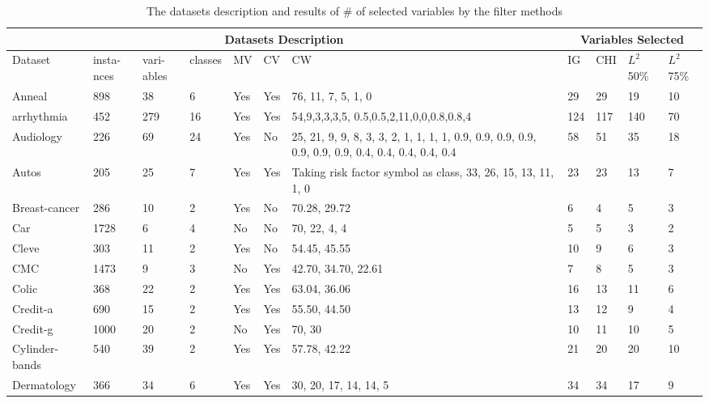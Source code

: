 \documentclass[review]{elsarticle}
\begin{document}
\begin{table}[p]
	\centering
	\caption[short tbl1 table1]{The datasets description and results of \# of selected variables by the filter methods}
	\label{tab:tbl1}
	
\begin{tabular}{|p{1.5cm}|p{0.5cm}|p{0.5cm}|p{0.5cm}|p{0.5cm}|p{0.5cm}|p{3cm}|p{0.5cm}|p{0.5cm}|p{1cm}|p{1cm}|}
	
	
	\hline 
	\multicolumn{7}{|c|}{Datasets Description} &
	\multicolumn{4}{|c|}{ Variables Selected } \\ 

\hline Dataset & insta-nces & vari-ables & classes & MV & CV & CW & IG & CHI & $ L^2 $ 50\%  & $ L^2 $ 75\% \\ 
	\hline Anneal & 898 & 38 & 6 & Yes & Yes & 76,  11, 7, 5, 1, 0 & 29 & 29 & 19 & 10 \\ 
	\hline arrhythmia & 452 & 279 & 16 & Yes & Yes & 54,9,3,3,3,5, 0.5,0.5,2,11,0,0,0.8,0.8,4 & 124 & 117 & 140 & 70 \\ 
\hline Audiology & 226 & 69 & 24 & Yes & No & 25,  21, 9, 9, 8, 3, 3, 2, 1, 1, 1, 1,  0.9, 0.9, 0.9, 0.9, 0.9, 0.9, 0.9, 0.4, 0.4, 0.4, 0.4,  0.4 & 58 & 51 & 35 & 18 \\ 
\hline Autos & 205 & 25 & 7 & Yes & Yes & Taking risk factor symbol as class,  33, 26, 15, 13, 11, 1, 0 & 23 & 23 & 13 & 7 \\ 
\hline Breast-cancer & 286 & 10 & 2 & Yes & No & 70.28, 29.72 & 6 & 4 & 5 & 3 \\ 
\hline Car & 1728 & 6 & 4 & No & No & 70,  22, 4, 4 & 5 & 5 & 3 & 2 \\ 
\hline Cleve & 303 & 11 & 2 & Yes & No & 54.45, 45.55 & 10 & 9 & 6 & 3 \\ 
\hline CMC & 1473 & 9 & 3 & No & Yes & 42.70, 34.70, 22.61  & 7 & 8 & 5 & 3 \\ 
\hline Colic & 368 & 22 & 2 & Yes & Yes & 63.04, 36.06 & 16 & 13 & 11 & 6 \\ 
\hline Credit-a & 690 & 15 & 2 & Yes & Yes & 55.50, 44.50 & 13 & 12 & 9 & 4 \\ 
\hline Credit-g & 1000 & 20 & 2 & No & Yes & 70, 30 & 10 & 11 & 10 & 5 \\
\hline Cylinder-bands & 540 & 39 & 2 & Yes & Yes & 57.78, 42.22 & 21 & 20 & 20 & 10 \\ 
\hline Dermatology & 366 & 34 & 6 & Yes & Yes & 30, 20, 17, 14, 14, 5 &  34 & 34 & 17 & 9 \\

\end{tabular}
\end{table}
\end{document}
